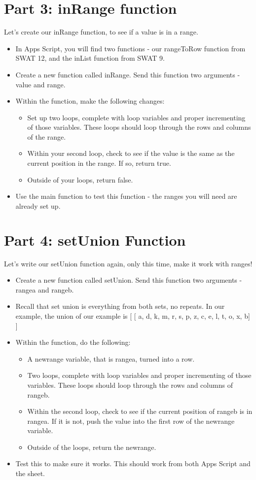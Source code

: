 \documentclass{article}
\begin{document}
\section*{Part 3: inRange function}
Let's create our inRange function, to see if a value is in a range.
\begin{itemize}
    \item In Apps Script, you will find two functions - our rangeToRow function from SWAT 12, and the inList function from SWAT 9.  
    \item Create a new function called inRange.  Send this function two arguments - value and range.
    \item Within the function, make the following changes:
    \begin{itemize}
    		\item Set up two loops, complete with loop variables and proper incrementing of those variables.  These loops should loop through the rows and columns of the range.
    		\item Within your second loop, check to see if the value is the same as the current position in the range.  If so, return true.
    		\item Outside of your loops, return false.
    	\end{itemize}
    	\item Use the main function to test this function - the ranges you will need are already set up.
\end{itemize}

\section*{Part 4: setUnion Function}
Let's write our setUnion function again, only this time, make it work with ranges!
\begin{itemize}
    \item Create a new function called setUnion.  Send this function two arguments - rangea and rangeb.
    \item Recall that set union is everything from both sets, no repeats.  In our example, the union of our example is [ [ a,	d,	k,	m,	r,	s,	p,	z,	c,	e,	l,	t,	o,	x,	b] ]
    \item Within the function, do the following:
    \begin{itemize}
    		\item A newrange variable, that is rangea, turned into a row.
    		\item Two loops, complete with loop variables and proper incrementing of those variables.  These loops should loop through the rows and columns of rangeb.
    		\item Within the second loop, check to see if the current position of rangeb is in rangea.  If it is not, push the value into the first row of the newrange variable.
    		\item Outside of the loops, return the newrange.
    	\end{itemize}
    	\item Test this to make sure it works.  This should work from both Apps Script and the sheet.
\end{itemize}
\end{document}
